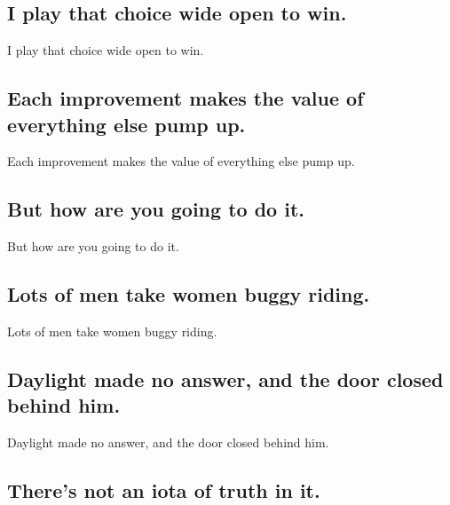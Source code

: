 \documentclass[]{article}
\begin{document}
\hypertarget{i-play-that-choice-wide-open-to-win.}{%
\subsection{I play that choice wide open to
win.}\label{i-play-that-choice-wide-open-to-win.}}

I play that choice wide open to win.

\hypertarget{each-improvement-makes-the-value-of-everything-else-pump-up.}{%
\subsection{Each improvement makes the value of everything else pump
up.}\label{each-improvement-makes-the-value-of-everything-else-pump-up.}}

Each improvement makes the value of everything else pump up.

\hypertarget{but-how-are-you-going-to-do-it.}{%
\subsection{But how are you going to do
it.}\label{but-how-are-you-going-to-do-it.}}

But how are you going to do it.

\hypertarget{lots-of-men-take-women-buggy-riding.}{%
\subsection{Lots of men take women buggy
riding.}\label{lots-of-men-take-women-buggy-riding.}}

Lots of men take women buggy riding.

\hypertarget{daylight-made-no-answer-and-the-door-closed-behind-him.}{%
\subsection{Daylight made no answer, and the door closed behind
him.}\label{daylight-made-no-answer-and-the-door-closed-behind-him.}}

Daylight made no answer, and the door closed behind him.

\hypertarget{theres-not-an-iota-of-truth-in-it.}{%
\subsection{There's not an iota of truth in
it.}\label{theres-not-an-iota-of-truth-in-it.}}
\end{document}
